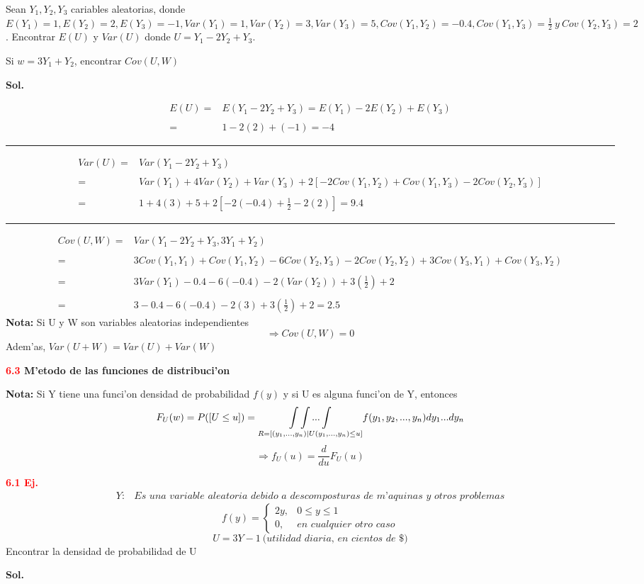 \documentclass[12pt,letterpaper]{article}
\theoremstyle{definition}
\begin{document}
Sean $Y_1,Y_2,Y_3$ cariables aleatorias, donde $E(Y_1)=1,E(Y_2)=2,E(Y_3)=-1, Var(Y_1)=1,Var(Y_2)=3,Var(Y_3)=5, Cov(Y_1,Y_2)=-0.4,Cov(Y_1,Y_3)=\frac{1}{2}\ y \ Cov(Y_2,Y_3)=2$. Encontrar $E(U)$ y $Var(U)$ donde $U=Y_1-2Y_2+Y_3$.

Si $w=3Y_1+Y_2$, encontrar $Cov(U,W)$

\textbf{Sol.}

\[
\begin{array}{rl}
	E(U)=&E(Y_1-2Y_2+Y_3)=E(Y_1)-2E(Y_2)+E(Y_3)\\ \\
	=& 1-2(2)+(-1)=-4
\end{array}
\]
\par\noindent\rule{\textwidth}{0.5pt}
\[
\begin{array}{rl}
	Var(U)= & Var(Y_1-2Y_2+Y_3)\\ \\
	=&Var(Y_1)+4Var(Y_2)+Var(Y_3)+2[-2Cov(Y_1,Y_2)+Cov(Y_1,Y_3)-2Cov(Y_2,Y_3)]\\ \\
	=& 1+4(3)+5+2[-2(-0.4)+\frac{1}{2}-2(2)]=9.4 
\end{array}
\]
\par\noindent\rule{\textwidth}{0.5pt}
\[
\begin{array}{rl}
	Cov(U,W)=& Var(Y_1-2Y_2+Y_3,3Y_1+Y_2)\\ \\
	=& 3Cov(Y_1,Y_1)+Cov(Y_1,Y_2)-6Cov(Y_2,Y_3)-2 Cov(Y_2,Y_2)+3Cov(Y_3,Y_1)+Cov(Y_3,Y_2)\\ \\
	=& 3Var(Y_1)-0.4-6(-0.4)-2(Var(Y_2))+3(\frac{1}{2})+2\\ \\
	=& 3-0.4-6(-0.4)-2(3)+3(\frac{1}{2})+2=2.5
\end{array}
\]
\textbf{Nota: } Si U y W son variables aleatorias independientes
\[\Rightarrow Cov(U,W)=0\]
Adem'as, $Var(U+W)=Var(U)+Var(W)$

\textbf{\textcolor{red}{6.3} M'etodo de las funciones de distribuci'on}
 
\textbf{Nota: } Si Y tiene una funci'on densidad de probabilidad $f(y)$ y si U es alguna funci'on de Y, entonces 
\[F_U(w)=P([U\leq u])=\underset{\begin{tiny}
R=[(y_1,...,y_n)|U(y_1,...,y_n)\leq u]
\end{tiny}}{\int\int...\int} f(y_1,y_2,...,y_n)dy_1...dy_n\]
\[\Rightarrow f_U(u)=\frac{d}{du}F_U(u)\]

\textbf{\textcolor{red}{6.1 Ej.}}
\[
\begin{array}{rl}
	Y:& \textit{Es una variable aleatoria debido a descomposturas de m'aquinas y otros problemas}
\end{array}
\]
\[f(y)=\left\{
\begin{array}{rl}
	2y,& 0\leq y\leq 1\\
	0, & \textit{en cualquier otro caso}
\end{array}\right.\]
\[U=3Y-1\ \textit{(utilidad diaria, en cientos de \$)}\]
Encontrar la densidad de probabilidad de U

\textbf{Sol.}
\end{document}
